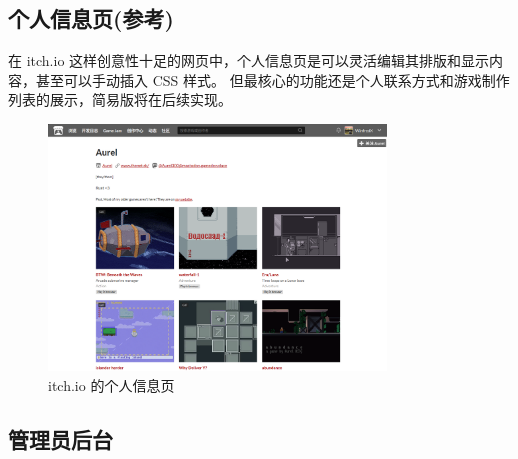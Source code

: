 \documentclass[12pt]{ctexart} %
\begin{document}
\subsection{个人信息页(参考)}

在 itch.io 这样创意性十足的网页中，个人信息页是可以灵活编辑其排版和显示内容，甚至可以手动插入 CSS 样式。
但最核心的功能还是个人联系方式和游戏制作列表的展示，简易版将在后续实现。

\begin{figure}[H]
  \centering
  \includegraphics[width=0.8\textwidth]{UI-profile.png}
  \caption{itch.io 的个人信息页}
\end{figure}


\subsection{管理员后台}
\end{document}
